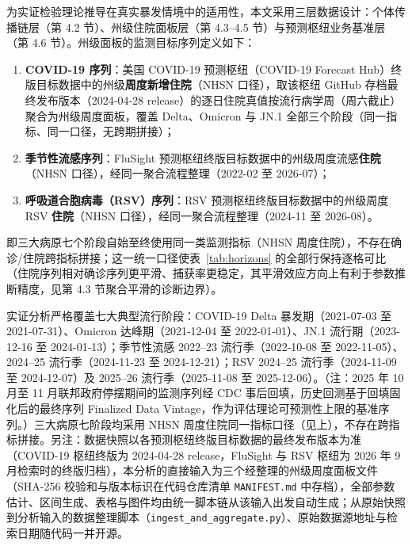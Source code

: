 \documentclass[11pt,a4paper]{article}
\theoremstyle{plain}
\theoremstyle{definition}
\begin{document}
为实证检验理论推导在真实暴发情境中的适用性，本文采用三层数据设计：个体传播链层（第 4.2 节）、州级住院面板层（第 4.3--4.5 节）与预测枢纽业务基准层（第 4.6 节）。州级面板的监测目标序列定义如下：
\begin{enumerate}
\item \textbf{COVID-19 序列}：美国 COVID-19 预测枢纽（COVID-19 Forecast Hub）终版目标数据中的州级\textbf{周度新增住院}（NHSN 口径），取该枢纽 GitHub 存档最终发布版本（2024-04-28 release）的逐日住院真值按流行病学周（周六截止）聚合为州级周度面板，覆盖 Delta、Omicron 与 JN.1 全部三个阶段（同一指标、同一口径，无跨期拼接）；
\item \textbf{季节性流感序列}：FluSight 预测枢纽终版目标数据中的州级周度流感\textbf{住院}（NHSN 口径），经同一聚合流程整理（2022-02 至 2026-07）；
\item \textbf{呼吸道合胞病毒（RSV）序列}：RSV 预测枢纽终版目标数据中的州级周度 RSV \textbf{住院}（NHSN 口径），经同一聚合流程整理（2024-11 至 2026-08）。
\end{enumerate}

即三大病原七个阶段自始至终使用同一类监测指标（NHSN 周度住院），不存在确诊/住院跨指标拼接；这一统一口径使表~\ref{tab:horizons} 的全部行保持逐格可比（住院序列相对确诊序列更平滑、捕获率更稳定，其平滑效应方向上有利于参数推断精度，见第 4.3 节聚合平滑的诊断边界）。

实证分析严格覆盖七大典型流行阶段：COVID-19 Delta 暴发期（2021-07-03 至 2021-07-31）、Omicron 达峰期（2021-12-04 至 2022-01-01）、JN.1 流行期（2023-12-16 至 2024-01-13）；季节性流感 2022--23 流行季（2022-10-08 至 2022-11-05）、2024--25 流行季（2024-11-23 至 2024-12-21）；RSV 2024--25 流行季（2024-11-09 至 2024-12-07）及 2025--26 流行季（2025-11-08 至 2025-12-06）。（注：2025 年 10 月至 11 月联邦政府停摆期间的监测序列经 CDC 事后回填，历史回测基于回填固化后的最终序列 Finalized Data Vintage，作为评估理论可预测性上限的基准序列。）三大病原七阶段均采用 NHSN 周度住院同一指标口径（见上），不存在跨指标拼接。另注：数据快照以各预测枢纽终版目标数据的最终发布版本为准（COVID-19 枢纽终版为 2024-04-28 release，FluSight 与 RSV 枢纽为 2026 年 9 月检索时的终版归档），本分析的直接输入为三个经整理的州级周度面板文件（SHA-256 校验和与版本标识在代码仓库清单 \texttt{MANIFEST.md} 中存档），全部参数估计、区间生成、表格与图件均由统一脚本链从该输入出发自动生成；从原始快照到分析输入的数据整理脚本（\texttt{ingest\_and\_aggregate.py}）、原始数据源地址与检索日期随代码一并开源。
\end{document}

